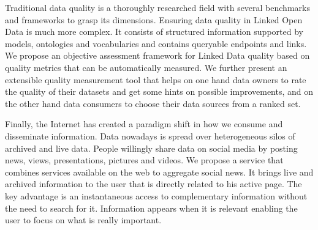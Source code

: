 Traditional data quality is a thoroughly researched field with several benchmarks and frameworks to grasp its dimensions. Ensuring data quality in Linked Open Data is much more complex. It consists of structured information supported by models, ontologies and vocabularies and contains queryable endpoints and links. We propose an objective assessment framework for Linked Data quality based on quality metrics that can be automatically measured. We further present an extensible quality measurement tool that helps on one hand data owners to rate the quality of their datasets and get some hints on possible improvements, and on the other hand data consumers to choose their data sources from a ranked set.

Finally, the Internet has created a paradigm shift in how we consume and disseminate information. Data nowadays is spread over heterogeneous silos of archived and live data. People willingly share data on social media by posting news, views, presentations, pictures and videos. We propose a service that combines services available on the web to aggregate social news. It brings live and archived information to the user that is directly related to his active page. The key advantage is an instantaneous access to complementary information without the need to search for it. Information appears when it is relevant enabling the user to focus on what is really important.